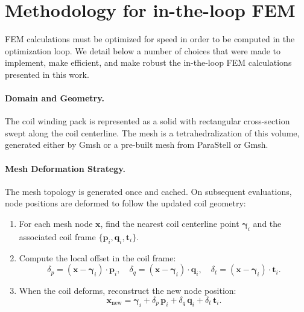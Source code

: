
\section{Methodology for in-the-loop FEM}\label{sec:appendix_B}

FEM calculations must be optimized for speed in order to be computed in the optimization loop. We detail below a number of choices that were made to implement, make efficient, and make robust the in-the-loop FEM calculations presented in this work.

\paragraph{Domain and Geometry.}
The coil winding pack is represented as a solid with rectangular cross-section swept along the coil centerline. The mesh is a tetrahedralization of this volume, generated either by Gmsh or a pre-built mesh from ParaStell or Gmsh.

\paragraph{Mesh Deformation Strategy.}
The mesh topology is generated once and cached. On subsequent evaluations, node positions are deformed to follow the updated coil geometry:
\begin{enumerate}
  \item For each mesh node $\mathbf{x}$, find the nearest coil centerline point $\boldsymbol{\gamma}_{i}$ and the associated coil frame $\{\mathbf{p}_i, \mathbf{q}_i, \mathbf{t}_i\}$.
  \item Compute the local offset in the coil frame:
    \begin{equation}
      \delta_p = (\mathbf{x} - \boldsymbol{\gamma}_i) \cdot \mathbf{p}_i,\quad
      \delta_q = (\mathbf{x} - \boldsymbol{\gamma}_i) \cdot \mathbf{q}_i,\quad
      \delta_t = (\mathbf{x} - \boldsymbol{\gamma}_i) \cdot \mathbf{t}_i.
    \end{equation}
  \item When the coil deforms, reconstruct the new node position:
    \begin{equation}
      \mathbf{x}_{\text{new}} = \boldsymbol{\gamma}_i + \delta_p \, \mathbf{p}_i + \delta_q \, \mathbf{q}_i + \delta_t \, \mathbf{t}_i.
    \end{equation}
\end{enumerate}

